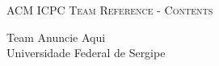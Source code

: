 \documentclass[a4paper]{amsart}
\begin{document}
  \enlargethispage*{\baselineskip}
  \pagebreak

  \begin{center}
    \Huge\textsc{ACM ICPC Team Reference - Contents}

    \vspace{0.35cm}

    \huge Team Anuncie Aqui \\ Universidade Federal de Sergipe

    \vspace{0.35cm}

  \end{center}

  \begin{multicols}{2}
    \tableofcontents
  \end{multicols}
\end{document}
